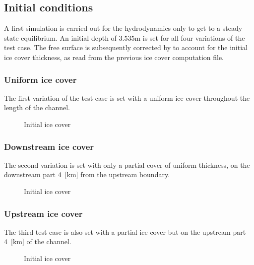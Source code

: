 \subsection{Initial conditions}
A first simulation is carried out for the hydrodynamics only to get to a steady state equilibrium.
An initial depth of 3.535m is set for all four variations of the test case. The free surface is subsequently corrected by \khione to account for the initial ice cover thickness, as read from the previous ice cover computation file.

\subsubsection{Uniform ice cover}
The first variation of the test case is set with a uniform ice cover throughout the length of the channel.

\begin{figure}[H]
    \begin{center}
    \end{center}
    \caption{Initial ice cover}
    \label{fig:ini-cover_01}
\end{figure}

\subsubsection{Downstream ice cover}
The second variation is set with only a partial cover of uniform thickness, on the downstream part 4~[km] from the upstream boundary.

\begin{figure}[H]
    \begin{center}
    \end{center}
    \caption{Initial ice cover}
    \label{fig:ini-cover_02}
\end{figure}

\subsubsection{Upstream ice cover}
The third test case is also set with a partial ice cover but on the upstream part 4~[km] of the channel.

\begin{figure}[H]
    \begin{center}
    \end{center}
    \caption{Initial ice cover}
    \label{fig:ini-cover_03}
\end{figure}

